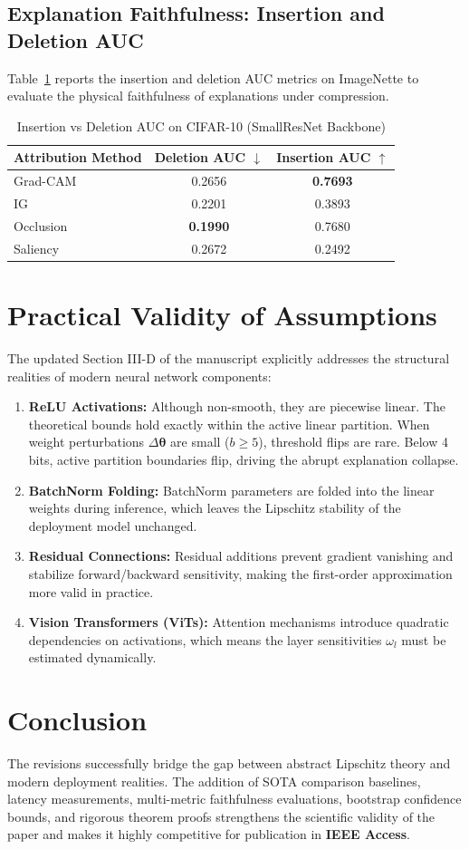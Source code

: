 \documentclass[11pt,a4paper]{article}
\begin{document}
\subsection{Explanation Faithfulness: Insertion and Deletion AUC}
Table~\ref{tab:auc} reports the insertion and deletion AUC metrics on ImageNette to evaluate the physical faithfulness of explanations under compression.

\begin{table}[h]
\caption{Insertion vs Deletion AUC on CIFAR-10 (SmallResNet Backbone)}
\label{tab:auc}
\centering
\begin{tabular}{lcc}
\toprule
\textbf{Attribution Method} & \textbf{Deletion AUC $\downarrow$} & \textbf{Insertion AUC $\uparrow$} \\
\midrule
Grad-CAM & 0.2656 & \textbf{0.7693} \\
IG & 0.2201 & 0.3893 \\
Occlusion & \textbf{0.1990} & 0.7680 \\
Saliency & 0.2672 & 0.2492 \\
\bottomrule
\end{tabular}
\end{table}

\section{Practical Validity of Assumptions}
The updated Section III-D of the manuscript explicitly addresses the structural realities of modern neural network components:
\begin{enumerate}
\item \textbf{ReLU Activations:} Although non-smooth, they are piecewise linear. The theoretical bounds hold exactly within the active linear partition. When weight perturbations $\Delta\bm{\theta}$ are small ($b \ge 5$), threshold flips are rare. Below 4 bits, active partition boundaries flip, driving the abrupt explanation collapse.
\item \textbf{BatchNorm Folding:} BatchNorm parameters are folded into the linear weights during inference, which leaves the Lipschitz stability of the deployment model unchanged.
\item \textbf{Residual Connections:} Residual additions prevent gradient vanishing and stabilize forward/backward sensitivity, making the first-order approximation more valid in practice.
\item \textbf{Vision Transformers (ViTs):} Attention mechanisms introduce quadratic dependencies on activations, which means the layer sensitivities $\omega_l$ must be estimated dynamically.
\end{enumerate}

\section{Conclusion}
The revisions successfully bridge the gap between abstract Lipschitz theory and modern deployment realities. The addition of SOTA comparison baselines, latency measurements, multi-metric faithfulness evaluations, bootstrap confidence bounds, and rigorous theorem proofs strengthens the scientific validity of the paper and makes it highly competitive for publication in \textbf{IEEE Access}.
\end{document}

